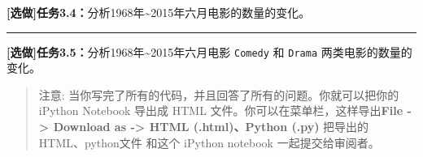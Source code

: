 \documentclass[11pt]{article}
\begin{document}
\textbf{{[}选做{]}任务3.4：}分析1968年\textasciitilde{}2015年六月电影的数量的变化。

    \begin{center}\rule{0.5\linewidth}{\linethickness}\end{center}

\textbf{{[}选做{]}任务3.5：}分析1968年\textasciitilde{}2015年六月电影
\texttt{Comedy} 和 \texttt{Drama} 两类电影的数量的变化。

    \begin{quote}
注意: 当你写完了所有的代码，并且回答了所有的问题。你就可以把你的 iPython
Notebook 导出成 HTML 文件。你可以在菜单栏，这样导出\textbf{File
-\textgreater{} Download as -\textgreater{} HTML (.html)、Python (.py)}
把导出的 HTML、python文件 和这个 iPython notebook 一起提交给审阅者。
\end{quote}


    
    
    
    
\end{document}

